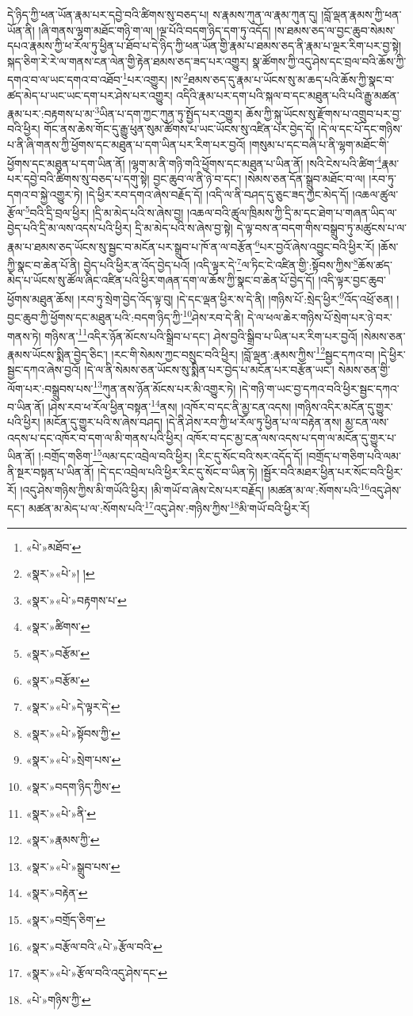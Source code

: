 དེ་ཉིད་ཀྱི་ཕན་ཡོན་རྣམ་པར་དབྱེ་བའི་ཚིགས་སུ་བཅད་པ། ས་རྣམས་ཀུན་ལ་རྣམ་ཀུན་དུ། །བློ་ལྡན་རྣམས་ཀྱི་ཕན་ཡོན་ནི། །ཞི་གནས་ལྷག་མཐོང་གཉི་ག་ལ། །ལྔ་པོའི་བདག་ཉིད་དག་ཏུ་འདོད། །ས་ཐམས་ཅད་ལ་བྱང་ཆུབ་སེམས་དཔའ་རྣམས་ཀྱི་ཕ་རོལ་ཏུ་ཕྱིན་པ་ཐོབ་པ་དེ་ཉིད་ཀྱི་ཕན་ཡོན་གྱི་རྣམ་པ་ཐམས་ཅད་ནི་རྣམ་པ་ལྔར་རིག་པར་བྱ་སྟེ། སྐད་ཅིག་རེ་རེ་ལ་གནས་ངན་ལེན་གྱི་རྟེན་ཐམས་ཅད་ཟད་པར་འགྱུར། སྣ་ཚོགས་ཀྱི་འདུ་ཤེས་དང་བྲལ་བའི་ཆོས་ཀྱི་དགའ་བ་ལ་ཡང་དགའ་བ་འཐོབ་\footnote{«པེ་»མཐོབ་}པར་འགྱུར། །ས་\footnote{«སྣར་»«པེ་»། །}ཐམས་ཅད་དུ་རྣམ་པ་ཡོངས་སུ་མ་ཆད་པའི་ཆོས་ཀྱི་སྣང་བ་ཚད་མེད་པ་ཡང་ཡང་དག་པར་ཤེས་པར་འགྱུར། འདིའི་རྣམ་པར་དག་པའི་སྐལ་བ་དང་མཐུན་པའི་པའི་རྒྱུ་མཚན་རྣམ་པར་:བརྟགས་པ་མ་\footnote{«སྣར་»«པེ་»བརྟགས་པ་}ཡིན་པ་དག་ཀྱང་ཀུན་ཏུ་སྤྱོད་པར་འགྱུར། ཆོས་ཀྱི་སྐུ་ཡོངས་སུ་རྫོགས་པ་འགྲུབ་པར་བྱ་བའི་ཕྱིར། གོང་ནས་ཆེས་གོང་དུ་རྒྱུ་ཕུན་སུམ་ཚོགས་པ་ཡང་ཡོངས་སུ་འཛིན་པར་བྱེད་དོ། །དེ་ལ་དང་པོ་དང་གཉིས་པ་ནི་ཞི་གནས་ཀྱི་ཕྱོགས་དང་མཐུན་པ་དག་ཡིན་པར་རིག་པར་བྱའོ། །གསུམ་པ་དང་བཞི་པ་ནི་ལྷག་མཐོང་གི་ཕྱོགས་དང་མཐུན་པ་དག་ཡིན་ནོ། །ལྷག་མ་ནི་གཉི་གའི་ཕྱོགས་དང་མཐུན་པ་ཡིན་ནོ། །སའི་ངེས་པའི་ཚིག་\footnote{«སྣར་»ཚིགས་}རྣམ་པར་དབྱེ་བའི་ཚིགས་སུ་བཅད་པ་དགུ་སྟེ། བྱང་ཆུབ་ལ་ནི་ཉེ་བ་དང་། །སེམས་ཅན་དོན་སྒྲུབ་མཐོང་བ་ལ། །རབ་ཏུ་དགའ་བ་སྐྱེ་འགྱུར་ཏེ། །དེ་ཕྱིར་རབ་དགའ་ཞེས་བརྗོད་དོ། །འདི་ལ་ནི་བཤད་དུ་ཅུང་ཟད་ཀྱང་མེད་དོ། །འཆལ་ཚུལ་རྩོལ་\footnote{«སྣར་»བརྩོམ་}བའི་དྲི་བྲལ་ཕྱིར། །དྲི་མ་མེད་པའི་ས་ཞེས་བྱ། །འཆལ་བའི་ཚུལ་ཁྲིམས་ཀྱི་དྲི་མ་དང་ཐེག་པ་གཞན་ཡིད་ལ་བྱེད་པའི་དྲི་མ་ལས་འདས་པའི་ཕྱིར། དྲི་མ་མེད་པའི་ས་ཞེས་བྱ་སྟེ། དེ་ལྟ་བས་ན་བདག་གིས་བསྒྲུབ་ཏུ་མཚུངས་པ་ལ་རྣམ་པ་ཐམས་ཅད་ཡོངས་སུ་སྦྱང་བ་མངོན་པར་སྒྲུབ་པ་ཁོ་ན་ལ་བརྩོན་\footnote{«སྣར་»བརྩོམ་}པར་བྱའོ་ཞེས་འབྱུང་བའི་ཕྱིར་རོ། །ཆོས་ཀྱི་སྣང་བ་ཆེན་པོ་ནི། བྱེད་པའི་ཕྱིར་ན་འོད་བྱེད་པའོ། །འདི་ལྟར་དེ་\footnote{«སྣར་»«པེ་»དེ་ལྟར་དེ་}ལ་ཏིང་ངེ་འཛིན་གྱི་:སྟོབས་ཀྱིས་\footnote{«སྣར་»«པེ་»སྟོབས་ཀྱི་}ཆོས་ཚད་མེད་པ་ཡོངས་སུ་ཚོལ་ཞིང་འཛིན་པའི་ཕྱིར་གཞན་དག་ལ་ཆོས་ཀྱི་སྣང་བ་ཆེན་པོ་བྱེད་དོ། །འདི་ལྟར་བྱང་ཆུབ་ཕྱོགས་མཐུན་ཆོས། །རབ་ཏུ་སྲེག་བྱེད་འོད་ལྟ་བུ། །དེ་དང་ལྡན་ཕྱིར་ས་དེ་ནི། །གཉིས་པོ་:སྲེད་ཕྱིར་\footnote{«སྣར་»«པེ་»སྲེག་པས་}འོད་འཕྲོ་ཅན། །བྱང་ཆུབ་ཀྱི་ཕྱོགས་དང་མཐུན་པའི་:བདག་ཉིད་ཀྱི་\footnote{«སྣར་»བདག་ཉིད་ཀྱིས་}ཤེས་རབ་དེ་ནི། དེ་ལ་ཕལ་ཆེར་གཉིས་པོ་སྲེག་པར་ཉེ་བར་གནས་ཏེ། གཉིས་ན་\footnote{«སྣར་»«པེ་»ནི་}འདིར་ཉོན་མོངས་པའི་སྒྲིབ་པ་དང་། ཤེས་བྱའི་སྒྲིབ་པ་ཡིན་པར་རིག་པར་བྱའོ། །སེམས་ཅན་རྣམས་ཡོངས་སྨིན་བྱེད་ཅིང་། །རང་གི་སེམས་ཀྱང་བསྲུང་བའི་ཕྱིར། །བློ་ལྡན་:རྣམས་ཀྱིས་\footnote{«སྣར་»རྣམས་ཀྱི་}སྦྱང་དཀའ་བ། །དེ་ཕྱིར་སྦྱང་དཀའ་ཞེས་བྱའོ། །དེ་ལ་ནི་སེམས་ཅན་ཡོངས་སུ་སྨིན་པར་བྱེད་པ་མངོན་པར་བརྩོན་ཡང་། སེམས་ཅན་གྱི་ལོག་པར་:བསྒྲུབས་པས་\footnote{«སྣར་»«པེ་»སྒྲུབ་པས་}ཀུན་ནས་ཉོན་མོངས་པར་མི་འགྱུར་ཏེ། །དེ་གཉི་ག་ཡང་བྱ་དཀའ་བའི་ཕྱིར་སྦྱང་དཀའ་བ་ཡིན་ནོ། །ཤེས་རབ་ཕ་རོལ་ཕྱིན་བསྟན་\footnote{«སྣར་»བརྟེན་}ནས། །འཁོར་བ་དང་ནི་མྱ་ངན་འདས། །གཉིས་འདིར་མངོན་དུ་གྱུར་པའི་ཕྱིར། །མངོན་དུ་གྱུར་པའི་ས་ཞེས་བཤད། །དེ་ནི་ཤེས་རབ་ཀྱི་ཕ་རོལ་ཏུ་ཕྱིན་པ་ལ་བརྟེན་ནས། མྱ་ངན་ལས་འདས་པ་དང་འཁོར་བ་དག་ལ་མི་གནས་པའི་ཕྱིར། འཁོར་བ་དང་མྱ་ངན་ལས་འདས་པ་དག་ལ་མངོན་དུ་གྱུར་པ་ཡིན་ནོ། །:བགྲོད་གཅིག་\footnote{«སྣར་»བགྲོད་ཅིག་}ལམ་དང་འབྲེལ་བའི་ཕྱིར། །རིང་དུ་སོང་བའི་སར་འདོད་དོ། །བགྲོད་པ་གཅིག་པའི་ལམ་ནི་སྔར་བསྟན་པ་ཡིན་ནོ། །དེ་དང་འབྲེལ་པའི་ཕྱིར་རིང་དུ་སོང་བ་ཡིན་ཏེ། །སྦྱོར་བའི་མཐར་ཕྱིན་པར་སོང་བའི་ཕྱིར་རོ། །འདུ་ཤེས་གཉིས་ཀྱིས་མི་གཡོའི་ཕྱིར། །མི་གཡོ་བ་ཞེས་ངེས་པར་བརྗོད། །མཚན་མ་ལ་:སོགས་པའི་\footnote{«སྣར་»བརྩོལ་བའི་«པེ་»རྩོལ་བའི་}འདུ་ཤེས་དང་། མཚན་མ་མེད་པ་ལ་:སོགས་པའི་\footnote{«སྣར་»«པེ་»རྩོལ་བའི་འདུ་ཤེས་དང་}འདུ་ཤེས་:གཉིས་ཀྱིས་\footnote{«པེ་»གཉིས་ཀྱི་}མི་གཡོ་བའི་ཕྱིར་རོ། 